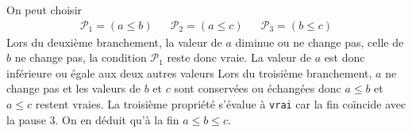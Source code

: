 On peut choisir
\begin{align*}
  \mathcal{P}_1 = \left( a \leq b \right) & & 
  \mathcal{P}_2 = \left( a \leq c \right) & &
  \mathcal{P}_3 = \left( b \leq c \right)
\end{align*}
Lors du deuxième branchement, la valeur de $a$ diminue ou ne change pas, celle de $b$ ne change pas, la condition $\mathcal{P}_1$ reste donc vraie. La valeur de $a$ est donc inférieure ou égale aux deux autres valeurs\newline
Lors du troisième branchement, $a$ ne change pas et les valeurs de $b$ et $c$ sont conservées ou échangées donc $a\leq b$ et $a\leq c$ restent vraies.\newline
La troisième propriété s'évalue à \verb|vrai| car la fin coïncide avec la pause 3. On en déduit qu'à la fin $a\leq b \leq c$.  